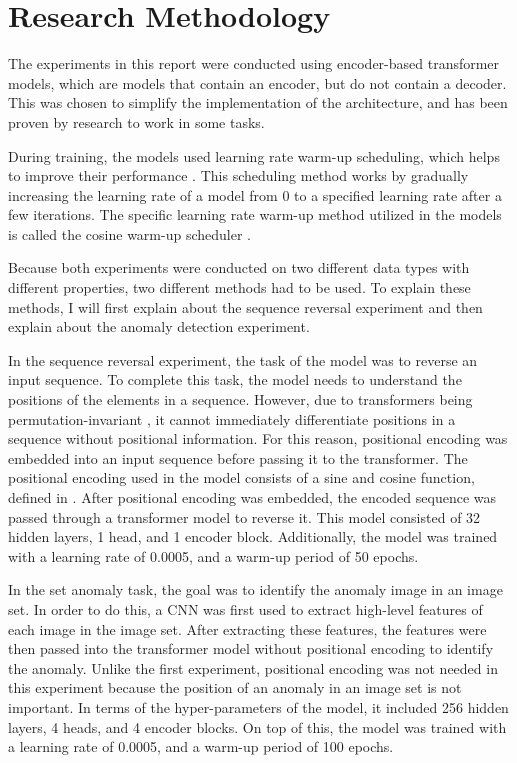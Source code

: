 \documentclass[peerreview]{IEEEtran}
\begin{document}
\section{Research Methodology}
The experiments in this report were conducted using encoder-based transformer models, which are models that contain an encoder, but do not contain a decoder. This was chosen to simplify the implementation of the architecture, and has been proven by research \cite{dosovitskiy_2021}\cite{devlin_2018} to work in some tasks. 

During training, the models used learning rate warm-up scheduling, which helps to improve their performance \cite{liu_2020}. This scheduling method works by gradually increasing the learning rate of a model from 0 to a specified learning rate after a few iterations. The specific learning rate warm-up method utilized in the models is called the cosine warm-up scheduler \cite{vaswani_2017}.

Because both experiments were conducted on two different data types with different properties, two different methods had to be used. To explain these methods, I will first explain about the sequence reversal experiment and then explain about the anomaly detection experiment.

In the sequence reversal experiment, the task of the model was to reverse an input sequence. To complete this task, the model needs to understand the positions of the elements in a sequence. However, due to transformers being permutation-invariant \cite{naseer_2021}, it cannot immediately differentiate positions in a sequence without positional information. For this reason, positional encoding was embedded into an input sequence before passing it to the transformer. The positional encoding used in the model consists of a sine and cosine function, defined in \cite{vaswani_2017}. After positional encoding was embedded, the encoded sequence was passed through a transformer model to reverse it. This model consisted of 32 hidden layers, 1 head, and 1 encoder block. Additionally, the model was trained with a learning rate of 0.0005, and a warm-up period of 50 epochs.

In the set anomaly task, the goal was to identify the anomaly image in an image set. In order to do this, a CNN was first used to extract high-level features of each image in the image set. After extracting these features, the features were then passed into the transformer model without positional encoding to identify the anomaly. Unlike the first experiment, positional encoding was not needed in this experiment because the position of an anomaly in an image set is not important. In terms of the hyper-parameters of the model, it included 256 hidden layers, 4 heads, and 4 encoder blocks. On top of this, the model was trained with a learning rate of 0.0005, and a warm-up period of 100 epochs.
\end{document}

